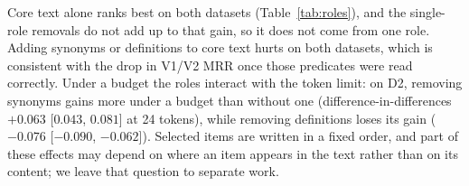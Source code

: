 Core text alone ranks best on both datasets (Table~\ref{tab:roles}), and
the single-role removals do not add up to that gain, so it does not come
from one role. Adding synonyms or definitions to core text hurts on both
datasets, which is consistent with the drop in V1/V2 MRR once those
predicates were read correctly. Under a budget the roles interact with the
token limit: on D2, removing synonyms gains more under a budget than without
one (difference-in-differences $+0.063$ [$0.043$, $0.081$] at 24 tokens),
while removing definitions loses its gain ($-0.076$ [$-0.090$, $-0.062$]).
Selected items are written in a fixed order, and part of these effects may
depend on where an item appears in the text rather than on its content; we
leave that question to separate work.

